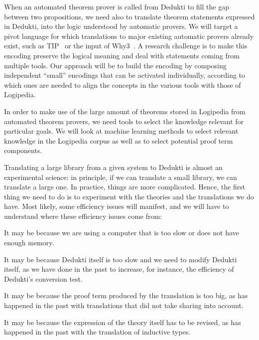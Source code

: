 When an automated theorem prover is called from Dedukti to fill the
gap between two propositions, we need also to translate theorem
statements expressed in Dedukti, into the logic understood by
automatic provers. We will target a pivot language for which
translations to major existing automatic provers already exist, such
as TIP~\cite{DBLP:conf/mkm/ClaessenJRS15} or the input of
Why3~\cite{DBLP:conf/esop/FilliatreP13}. A research challenge is to
make this encoding preserve the logical meaning and deal with
statements coming from multiple tools. Our approach will be to build
the encoding by composing independent ``small'' encodings that can be
activated individually, according to which ones are needed to align
the concepts in the various tools with those of Logipedia.

In order to make use of the large amount of theorems stored in
Logipedia from automated theorem provers, we need tools to select the
knowledge relevant for particular goals. We will look at machine
learning methods to select relevant knowledge in the Logipedia corpus
as well as to select potential proof term components.


Translating a large library from a given system to Dedukti is almost
an experimental science: in principle, if we can translate a small
library, we can translate a large one. In practice, things are more
complicated.  Hence, the first thing we need to do is to experiment
with the theories and the translations we do have. Most likely, some
efficiency issues will manifest, and we will have to understand where
these efficiency issues come from:

\begin{compactitem}
\item It may be because we are using a computer that is too slow or
  does not have enough memory.
\item It may be because Dedukti itself is too slow and we need to modify
  Dedukti itself, as we have done in the past to increase, for instance,
  the efficiency of Dedukti's conversion test.
\item It may be because the proof term produced by the translation is
  too big, as has happened in the past with translations that did not
  take sharing into account.
\item It may be because the expression of the theory itself has to be
  revised, as has happened in the past with the translation of
  inductive types.
\end{compactitem}

